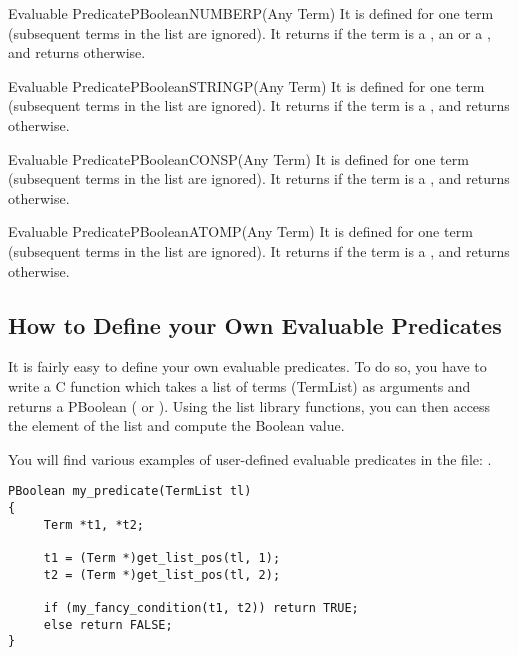 \begin{typeep}{Evaluable Predicate}{PBoolean}{NUMBERP}{(Any Term)}
It is defined for one term (subsequent terms in the list are ignored). It
returns  if the term is a , an  or a , and 
returns  otherwise.
\end{typeep}

\begin{typeep}{Evaluable Predicate}{PBoolean}{STRINGP}{(Any Term)}
It is defined for one term (subsequent terms in the list are ignored). It
returns  if the term is a , and 
returns  otherwise.
\end{typeep}

\begin{typeep}{Evaluable Predicate}{PBoolean}{CONSP}{(Any Term)}
It is defined for one term (subsequent terms in the list are ignored). It
returns  if the term is a , and 
returns  otherwise.
\end{typeep}

\begin{typeep}{Evaluable Predicate}{PBoolean}{ATOMP}{(Any Term)}
It is defined for one term (subsequent terms in the list are ignored). It
returns  if the term is a , and 
returns  otherwise.
\end{typeep}

\subsection{How to Define your Own Evaluable Predicates}

It is fairly easy to define your own evaluable predicates. To do so, you
have to write a C function which takes a list of terms (TermList) as
arguments and returns a PBoolean ( or ). Using the list library
functions, you can then access the element of the list and compute the
Boolean value.

You will find various examples of user-defined evaluable predicates in the
file: .

\begin{verbatim}
PBoolean my_predicate(TermList tl)
{
     Term *t1, *t2;

     t1 = (Term *)get_list_pos(tl, 1);
     t2 = (Term *)get_list_pos(tl, 2);

     if (my_fancy_condition(t1, t2)) return TRUE;
     else return FALSE;
}
\end{verbatim}

